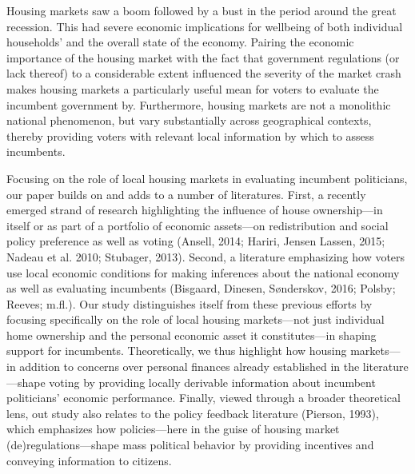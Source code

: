 \documentclass[12pt,a4paper]{article}
\begin{document}
Housing markets saw a boom followed by a bust in the period around the great recession. This had severe economic implications for wellbeing of both individual households’ and the overall state of the economy. Pairing the economic importance of the housing market with the fact that government regulations (or lack thereof) to a considerable extent influenced the severity of the market crash makes housing markets a particularly useful mean for voters to evaluate the incumbent government by. Furthermore, housing markets are not a monolithic national phenomenon, but vary substantially across geographical contexts, thereby providing voters with relevant local information by which to assess incumbents. 

Focusing on the role of local housing markets in evaluating incumbent politicians, our paper builds on and adds to a number of literatures. First, a recently emerged strand of research highlighting the influence of house ownership—in itself or as part of a portfolio of economic assets—on redistribution and social policy preference as well as voting (Ansell, 2014; Hariri, Jensen Lassen, 2015; Nadeau et al. 2010; Stubager, 2013). Second, a literature emphasizing how voters use local economic conditions for making inferences about the national economy as well as evaluating incumbents (Bisgaard, Dinesen, Sønderskov, 2016; Polsby; Reeves; m.fl.). Our study distinguishes itself from these previous efforts by focusing specifically on the role of local housing markets—not just individual home ownership and the personal economic asset it constitutes—in shaping support for incumbents. Theoretically, we thus highlight how housing markets—in addition to concerns over personal finances already established in the literature—shape voting by providing locally derivable information about incumbent politicians’ economic performance. Finally, viewed through a broader theoretical lens, out study also relates to the policy feedback literature (Pierson, 1993), which emphasizes how policies—here in the guise of housing market (de)regulations—shape mass political behavior by providing incentives and conveying information to citizens.
\end{document}
